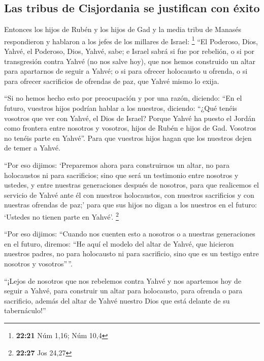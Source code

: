 \begin{paracol}{2}
\hypertarget{las-tribus-de-cisjordania-se-justifican-con-uxe9xito}{%
\subsection{Las tribus de Cisjordania se justifican con
éxito}\label{las-tribus-de-cisjordania-se-justifican-con-uxe9xito}}

 Entonces los hijos de Rubén y los hijos de Gad y la
media tribu de Manasés respondieron y hablaron a los jefes de los
millares de Israel: \footnote{\textbf{22:21} Núm 1,16; Núm 10,4}
 ``El Poderoso, Dios, Yahvé, el Poderoso, Dios, Yahvé,
sabe; e Israel sabrá si fue por rebelión, o si por transgresión contra
Yahvé (no nos salve hoy),  que nos hemos construido un
altar para apartarnos de seguir a Yahvé; o si para ofrecer holocausto u
ofrenda, o si para ofrecer sacrificios de ofrendas de paz, que Yahvé
mismo lo exija.

 ``Si no hemos hecho esto por preocupación y por una
razón, diciendo: ``En el futuro, vuestros hijos podrían hablar a los
nuestros, diciendo: ``¿Qué tenéis vosotros que ver con Yahvé, el Dios de
Israel?  Porque Yahvé ha puesto el Jordán como frontera
entre nosotros y vosotros, hijos de Rubén e hijos de Gad. Vosotros no
tenéis parte en Yahvé''. Para que vuestros hijos hagan que los nuestros
dejen de temer a Yahvé.

 ``Por eso dijimos: `Preparemos ahora para construirnos
un altar, no para holocaustos ni para sacrificios;  sino
que será un testimonio entre nosotros y ustedes, y entre nuestras
generaciones después de nosotros, para que realicemos el servicio de
Yahvé ante él con nuestros holocaustos, con nuestros sacrificios y con
nuestras ofrendas de paz;' para que sus hijos no digan a los nuestros en
el futuro: `Ustedes no tienen parte en Yahvé'. \footnote{\textbf{22:27}
  Jos 24,27}

 ``Por eso dijimos: ``Cuando nos cuenten esto a nosotros
o a nuestras generaciones en el futuro, diremos: ``He aquí el modelo del
altar de Yahvé, que hicieron nuestros padres, no para holocausto ni para
sacrificio, sino que es un testigo entre nosotros y vosotros''\,''.

 ``¡Lejos de nosotros que nos rebelemos contra Yahvé y
nos apartemos hoy de seguir a Yahvé, para construir un altar para
holocausto, para ofrenda o para sacrificio, además del altar de Yahvé
nuestro Dios que está delante de su tabernáculo!''


\end{paracol}
